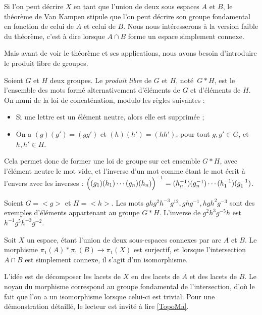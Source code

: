 Si l'on peut décrire $X$ en tant que l'union de deux sous espaces $A$ et $B$, le théorème de Van Kampen stipule que l'on peut décrire son groupe fondamental en fonction de celui de $A$ et celui de $B$. Nous nous intéresserons à la version faible du théorème, c'est à dire lorsque $A\cap B$ forme un espace simplement connexe.

Mais avant de voir le théorème et ses applications, nous avons besoin d'introduire le produit libre de groupes.

\begin{definition}
Soient $G$ et $H$ deux groupes. Le \emph{produit libre} de $G$ et $H$, noté~$G\ast H$, est le l'ensemble des mots formé alternativement d'éléments de $G$ et d'éléments de $H$. On muni de la loi de concaténation, modulo les règles suivantes : \begin{itemize}
    \item Si une lettre est un élément neutre, alors elle est supprimée ;
    \item On a $(g)(g')=(gg')$ et $(h)(h')=(hh')$, pour tout $g,g'\in G$, et $h,h'\in H$.
\end{itemize}
Cela permet donc de former une loi de groupe sur cet ensemble $G\ast H$, avec l'élément neutre le mot vide, et l'inverse d'un mot comme étant le mot écrit à l'envers avec les inverses : $\Big((g_1)(h_1)\cdots(g_n)(h_n)\Big)^{-1}=(h_n^{-1})(g_n^{-1})\cdots(h_1^{-1})(g_1^{-1})$.
\end{definition}

\begin{exemple}
Soient $G=<g>$ et $H=<h>$. Les mots $ghg^2h^{-3}g^{12}, ghg^{-1}, hgh^2g^{-3}$ sont des exemples d'éléments appartenant au groupe $G\ast H$. L'inverse de $g^2h^3g^{-5}h$ est $h^{-1}g^5h^{-3}g^{-2}$.
\end{exemple}

\begin{theorem}\label{th:van-kampen}
Soit $X$ un espace, étant l'union de deux sous-espaces connexes par arc $A$ et $B$. Le morphisme $\pi_1(A)\ast\pi_1(B)\to\pi_1(X)$ est surjectif, et lorsque l'intersection $A\cap B$ est simplement connexe, il s'agit d'un isomorphisme.
\end{theorem}

L'idée est de décomposer les lacets de $X$ en des lacets de $A$ et des lacets de $B$. Le noyau du morphisme correspond au groupe fondamental de l'intersection, d'où le fait que l'on a un isomorphisme lorsque celui-ci est trivial. Pour une démonstration détaillé, le lecteur est invité à lire \href{https://www.normalesup.org/~fjacobe/Topo.pdf}{[TopoMa]}.

